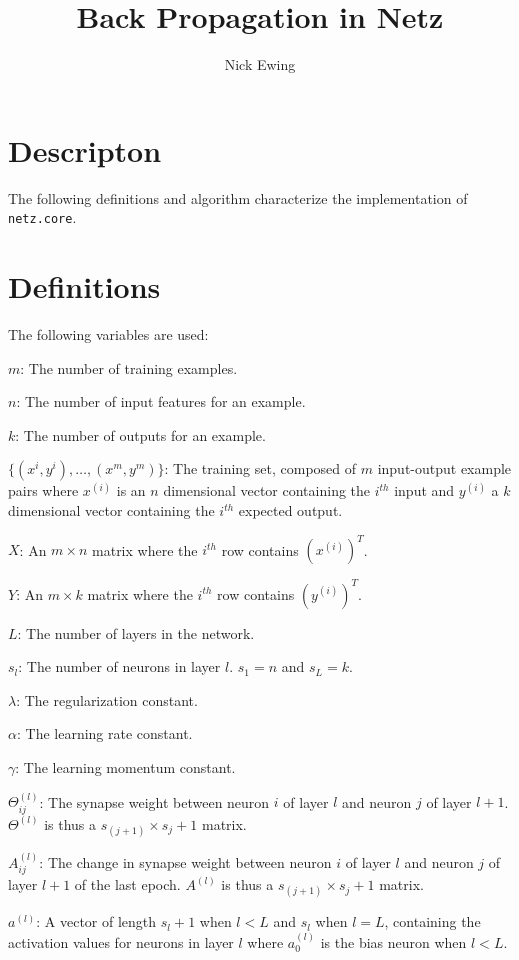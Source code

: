 \documentclass[12pt,notitlepage]{report}
\title{Back Propagation in Netz}
\author{Nick Ewing}
\date{}
\begin{document}
  \maketitle

  \section{Descripton}

  The following definitions and algorithm characterize the implementation of
  {\tt netz.core}.

  \section{Definitions}

  The following variables are used:

  $m$: The number of training examples.

  $n$: The number of input features for an example.

  $k$: The number of outputs for an example.

  $\{(x^{i}, y^{i}), \dots, (x^{m}, y^{m})\}$: The training set, composed of $m$
  input-output example pairs where $x^{(i)}$ is an $n$ dimensional vector
  containing the $i^{th}$ input and $y^{(i)}$ a $k$ dimensional vector
  containing the $i^{th}$ expected output.

  $X$: An $m \times n$ matrix where the $i^{th}$ row contains $(x^{(i)})^{T}$.

  $Y$: An $m \times k$ matrix where the $i^{th}$ row contains $(y^{(i)})^{T}$.

  $L$: The number of layers in the network.

  $s_{l}$: The number of neurons in layer $l$.  $s_{1} = n$ and $s_{L} = k$.

  $\lambda$: The regularization constant.

  $\alpha$: The learning rate constant.

  $\gamma$: The learning momentum constant.

  $\Theta_{ij}^{(l)}$: The synapse weight between neuron $i$ of layer $l$ and
  neuron $j$ of layer $l+1$.  $\Theta^{(l)}$ is thus a
  $s_{(j+1)} \times s_{j}+1$ matrix.

  $A_{ij}^{(l)}$: The change in synapse weight between neuron $i$ of layer $l$
  and neuron $j$ of layer $l+1$ of the last epoch.  $A^{(l)}$ is thus a
  $s_{(j+1)} \times s_{j}+1$ matrix.

  $a^{(l)}$: A vector of length $s_{l} + 1$ when $l < L$ and $s_{l}$ when $l =
  L$, containing the activation values for neurons in layer $l$ where
  $a_{0}^{(l)}$ is the bias neuron when $l < L$.
\end{document}
